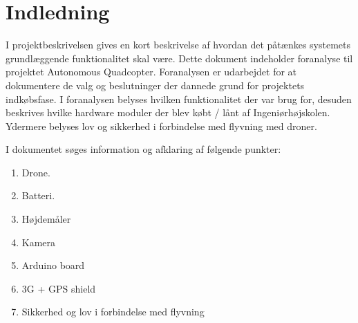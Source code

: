 \section{Indledning}

I projektbeskrivelsen gives en kort beskrivelse af hvordan det påtænkes systemets grundlæggende funktionalitet skal være. Dette dokument indeholder foranalyse til projektet Autonomous Quadcopter. 
Foranalysen er udarbejdet for at dokumentere de valg og beslutninger der dannede grund for projektets indkøbsfase. I foranalysen belyses hvilken funktionalitet der var brug for, desuden beskrives hvilke hardware moduler der blev købt / lånt af Ingeniørhøjskolen. Ydermere belyses lov og sikkerhed i forbindelse med flyvning med droner.

I dokumentet søges information og afklaring af følgende punkter:
\begin{enumerate}[label*=\arabic*.]
	\item Drone.
	\item Batteri. 
	\item Højdemåler
	\item Kamera
	\item Arduino board
	\item 3G + GPS shield
	\item Sikkerhed og lov i forbindelse med flyvning
\end{enumerate}